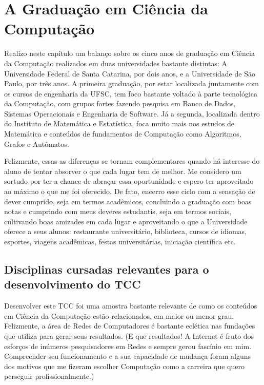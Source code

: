 \chapter{A Graduação em Ciência da Computação}
\label{cap:a_graduacao}
Realizo neste capítulo um balanço sobre os cinco anos de graduação em Ciência
da Computação realizados em duas universidades bastante distintas: A 
Universidade Federal de Santa Catarina, por dois anos, e a Universidade de São
Paulo, por três anos. A primeira graduação, por estar localizada juntamente
com os cursos de engenharia da UFSC, tem foco bastante voltado à parte
tecnológica da Computação, com grupos fortes fazendo pesquisa em Banco de Dados,
Sistemas Operacionais e Engenharia de Software. Já a segunda, localizada dentro
do Instituto de Matemática e Estatística, foca muito mais nos estudos de 
Matemática e conteúdos de fundamentos de Computação como Algoritmos, Grafos e 
Autômatos. 

Felizmente, essas as diferenças se tornam complementares quando há interesse 
do aluno de tentar absorver o que cada lugar tem de melhor. Me considero um
sortudo por ter a chance de abraçar essa oportunidade e espero ter aproveitado
ao máximo o que me foi oferecido. De fato, encerro esse ciclo com a sensação de
dever cumprido, seja em termos acadêmicos, concluindo a graduação com boas notas
e cumprindo com meus deveres estudantis, seja em termos sociais, cultivando 
boas amizades em cada lugar e aproveitando o que a Universidade oferece a seus
alunos: restaurante universitário, biblioteca, cursos de idiomas, esportes,
viagens acadêmicas, festas universitárias, iniciação científica etc.

\section{Disciplinas cursadas relevantes para o desenvolvimento do TCC}
\label{sec:disciplinas_relevantes}
Desenvolver este TCC foi uma amostra bastante relevante de como os conteúdos em
Ciência da Computação estão relacionados, em maior ou menor grau. Felizmente, 
a área de Redes de Computadores é bastante eclética nas fundações que utiliza
para gerar seus resultados. (E que resultados! A Internet é fruto dos esforços
de inúmeros pesquisadores em Redes e sempre gerou fascínio em mim. Compreender
seu funcionamento e a sua capacidade de mudança foram alguns dos motivos que 
me fizeram escolher Computação como a carreira que quero perseguir
profissionalmente.)

